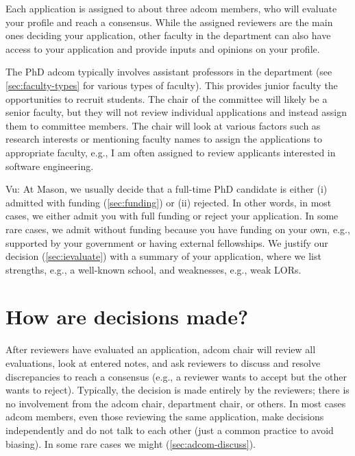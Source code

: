 \documentclass[oneside,11pt,dvipsnames]{book}
\newenvironment{commentbox}[1][]{
  \small
  \begin{mybox}
    {\small \textbf{#1}}
  }{
  \end{mybox}
}
\def\sectioninfo#1{%
  \addcontentsline{toc}{sectioninfo}{%
    \noexpand\numberline{}\color{black}{#1}}%
}
\newcommand{\mycomment}[3][\color{blue}]{{#1{{#2}: {#3}}}}
\newcommand{\didi}[1]{\mycomment{Didier}{#1}}{}
\begin{document}
Each application is assigned to about three adcom members, who will evaluate your profile and reach a consensus.  While the assigned reviewers are the main ones deciding your application, other faculty in the department can also have access to your application and provide inputs and opinions on your profile.

The PhD adcom typically involves assistant professors in the department (see \autoref{sec:faculty-types} for various types of faculty). This provides junior faculty the opportunities to recruit students. The chair of the committee will likely be a senior faculty, but they will not review individual applications and instead assign them to committee members. The chair will look at various factors such as research interests or mentioning faculty names to assign the applications to appropriate faculty, e.g., I am often assigned to review applicants interested in software engineering.

\begin{commentbox}{Vu:}
At Mason, we usually decide that a full-time PhD candidate is either (i) admitted with funding (\autoref{sec:funding}) or (ii) rejected. In other words, in most cases, we either
admit you with full funding or reject your application. In some rare cases, we admit
without funding because you have funding on your own, e.g.,
supported by your government or having external fellowships. We justify
our decision (\autoref{sec:ievaluate}) with a summary of your application, where we list
strengths, e.g., a well-known school, and weaknesses, e.g., weak
LORs.
\end{commentbox}



\section{How are decisions made?}\label{sec:how-decisions}
\sectioninfo{Even if all adcom reviewers recommend acceptance, the application can still be rejected. Vice versa, if all reviewers think the application is weak, the student might still be admitted.}

After reviewers have evaluated an application, adcom chair will review all evaluations, look at entered notes, and ask reviewers to discuss and resolve discrepancies to reach a consensus (e.g., a reviewer wants to accept but the other wants to reject).  Typically, the decision is made entirely by the reviewers; there is no involvement from the adcom chair, department chair, or others. In most cases adcom members, even those reviewing the same application, make decisions independently and do not talk to each other (just a common practice to avoid biasing). In some rare cases we might (\autoref{sec:adcom-discuss}).
\end{document}
